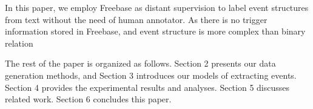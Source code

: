 In this paper, we employ Freebase as distant supervision to label event structures from text without the need of human annotator. As there is no trigger information stored in Freebase, and event structure is more complex than binary relation 

The rest of the paper is organized as follows. Section 2 presents our data generation methods, and Section 3 introduces our models of extracting events. Section 4 provides the experimental results and analyses. Section 5 discusses related work. Section 6 concludes this paper.
